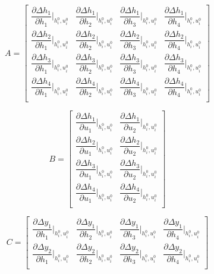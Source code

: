 \[
A =
\begin{bmatrix}
  \dfrac{\partial \Delta h_1}{\partial h_1} \bigg|_{h_i^0, u_i^0} &
  \dfrac{\partial \Delta h_1}{\partial h_2} \bigg|_{h_i^0, u_i^0} &
  \dfrac{\partial \Delta h_1}{\partial h_3} \bigg|_{h_i^0, u_i^0} &
  \dfrac{\partial \Delta h_1}{\partial h_4} \bigg|_{h_i^0, u_i^0} \\

  \dfrac{\partial \Delta h_2}{\partial h_1} \bigg|_{h_i^0, u_i^0} &
  \dfrac{\partial \Delta h_2}{\partial h_2} \bigg|_{h_i^0, u_i^0} &
  \dfrac{\partial \Delta h_2}{\partial h_3} \bigg|_{h_i^0, u_i^0} &
  \dfrac{\partial \Delta h_2}{\partial h_4} \bigg|_{h_i^0, u_i^0} \\

  \dfrac{\partial \Delta h_3}{\partial h_1} \bigg|_{h_i^0, u_i^0} &
  \dfrac{\partial \Delta h_3}{\partial h_2} \bigg|_{h_i^0, u_i^0} &
  \dfrac{\partial \Delta h_3}{\partial h_3} \bigg|_{h_i^0, u_i^0} &
  \dfrac{\partial \Delta h_3}{\partial h_4} \bigg|_{h_i^0, u_i^0} \\

  \dfrac{\partial \Delta h_4}{\partial h_1} \bigg|_{h_i^0, u_i^0} &
  \dfrac{\partial \Delta h_4}{\partial h_2} \bigg|_{h_i^0, u_i^0} &
  \dfrac{\partial \Delta h_4}{\partial h_3} \bigg|_{h_i^0, u_i^0} &
  \dfrac{\partial \Delta h_4}{\partial h_4} \bigg|_{h_i^0, u_i^0} \\
\end{bmatrix}
\]

\[
B =
\begin{bmatrix}
  \dfrac{\partial \Delta h_1}{\partial u_1} \bigg|_{h_i^0, u_i^0} &
  \dfrac{\partial \Delta h_1}{\partial u_2} \bigg|_{h_i^0, u_i^0} \\

  \dfrac{\partial \Delta h_2}{\partial u_1} \bigg|_{h_i^0, u_i^0} &
  \dfrac{\partial \Delta h_2}{\partial u_2} \bigg|_{h_i^0, u_i^0} \\

  \dfrac{\partial \Delta h_3}{\partial u_1} \bigg|_{h_i^0, u_i^0} &
  \dfrac{\partial \Delta h_3}{\partial u_2} \bigg|_{h_i^0, u_i^0} \\

  \dfrac{\partial \Delta h_4}{\partial u_1} \bigg|_{h_i^0, u_i^0} &
  \dfrac{\partial \Delta h_4}{\partial u_2} \bigg|_{h_i^0, u_i^0} \\
\end{bmatrix}
\]

\[
C =
\begin{bmatrix}
  \dfrac{\partial \Delta y_1}{\partial h_1} \bigg|_{h_i^0, u_i^0} &
  \dfrac{\partial \Delta y_1}{\partial h_2} \bigg|_{h_i^0, u_i^0} &
  \dfrac{\partial \Delta y_1}{\partial h_3} \bigg|_{h_i^0, u_i^0} &
  \dfrac{\partial \Delta y_1}{\partial h_4} \bigg|_{h_i^0, u_i^0} \\

  \dfrac{\partial \Delta y_2}{\partial h_1} \bigg|_{h_i^0, u_i^0} &
  \dfrac{\partial \Delta y_2}{\partial h_2} \bigg|_{h_i^0, u_i^0} &
  \dfrac{\partial \Delta y_2}{\partial h_3} \bigg|_{h_i^0, u_i^0} &
  \dfrac{\partial \Delta y_2}{\partial h_4} \bigg|_{h_i^0, u_i^0} \\
\end{bmatrix}
\]

